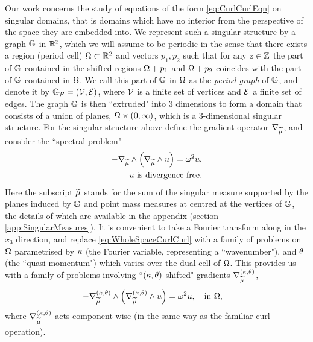 Our work concerns the study of equations of the form \eqref{eq:CurlCurlEqn} on singular domains, that is domains which have no interior from the perspective of the space they are embedded into.
We represent such a singular structure by a graph $\mathbb{G}$ in $\mathbb{R}^2$, which we will assume to be periodic in the sense that there exists a region (period cell) $\Omega\subset\mathbb{R}^2$ and vectors $p_1, p_2$ such that for any $z\in\mathbb{Z}$ the part of $\mathbb{G}$ contained in the shifted regions $\Omega+p_1$ and $\Omega+p_2$ coincides with the part of $\mathbb{G}$ contained in $\Omega$.
We call this part of $\mathbb{G}$ in $\Omega$ as the \emph{period graph} of $\mathbb{G}$, and denote it by $\mathbb{G}_{\mathcal{P}}=\left( \mathcal{V}, \mathcal{E} \right)$, where $\mathcal{V}$ is a finite set of vertices and $\mathcal{E}$ a finite set of edges.
The graph $\mathbb{G}$ is then ``extruded" into 3 dimensions to form a domain that consists of a union of planes, $\Omega\times\left( 0,\infty \right)$, which is a 3-dimensional singular structure.
For the singular structure above define the gradient operator $\nabla_{\widetilde{\mu}}$, and consider the ``spectral problem"
\begin{subequations} \label{eq:WholeSpaceCurlCurl}
	\begin{align} 
		-\nabla_{\widetilde{\mu}}\wedge \left(  \nabla_{\widetilde{\mu}}\wedge u  \right) = \omega^2 u &, \\
		u \text{ is divergence-free} &.
	\end{align}
\end{subequations}
Here the subscript $\widetilde{\mu}$ stands for the sum of the singular measure supported by the planes induced by $\mathbb{G}$ and point mass measures at centred at the vertices of $\mathbb{G}$, the details of which are available in the appendix (section \ref{app:SingularMeasures}).
It is convenient to take a Fourier transform along in the $x_3$ direction, and replace \eqref{eq:WholeSpaceCurlCurl} with a family of problems on $\Omega$ parametrised by $\kappa$ (the Fourier variable, representing a ``wavenumber"), and $\theta$ (the ``quasi-momentum") which varies over the dual-cell of $\Omega$.
This provides us with a family of problems involving ``$\left( \kappa, \theta \right)$-shifted" gradients $\nabla^{\left( \kappa, \theta \right)}_{\widetilde{\mu}}$,
\begin{align} \label{eq:PeriodCellCurlCurlStrongForm}
	- \nabla_{\widetilde{\mu}}^{\left( \kappa, \theta \right)}\wedge \left(  \nabla_{\widetilde{\mu}}^{\left( \kappa, \theta \right)}\wedge u  \right) &= \omega^2 u, \quad\text{in } \Omega,
\end{align}
where $\nabla^{\left( \kappa, \theta \right)}_{\widetilde{\mu}}$ acts component-wise (in the same way as the familiar curl operation). %
